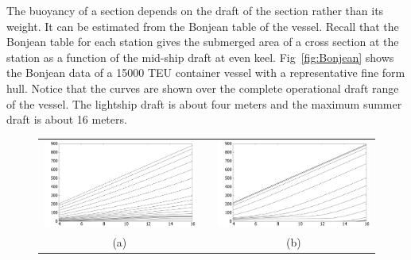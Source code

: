 \documentclass[runningheads]{llncs}
\begin{document}
The buoyancy of a section depends on the draft of the section rather than its weight. It can be estimated from the Bonjean table of the vessel. Recall that the Bonjean table for each station gives the submerged area of a cross section at the station as a function of the mid-ship draft at even keel. Fig~\ref{fig:Bonjean} shows the Bonjean data of a 15000 TEU container vessel with a representative fine form hull. Notice that the curves are shown over the complete operational draft range of the vessel. The lightship draft is about four meters and the maximum summer draft is about 16 meters.
\begin{figure}[h!]
  \begin{tabular}{ccc}
 \includegraphics[scale=0.14]{figures/BonjeanFore} &  &   \includegraphics[scale=0.14]{figures/BonjeanAft} \\
          (a)                              &  &                   (b)   \\

\end{tabular}
\end{figure}
\end{document}
